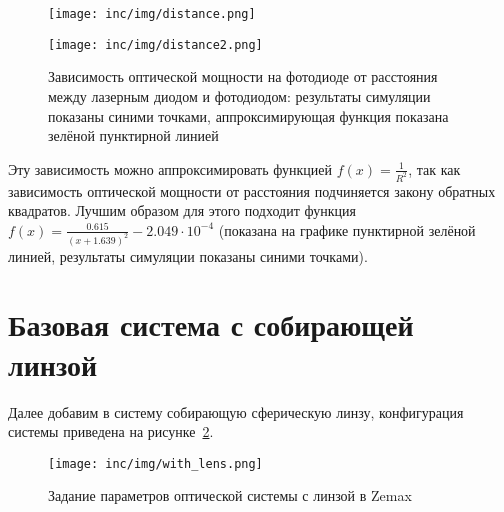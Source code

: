\begin{figure}[h]
    \centering
    \begin{minipage}[c]{.49\textwidth}
        \centering
        \texttt{[image: inc/img/distance.png]}
    \end{minipage}
    \hfill
    \begin{minipage}[c]{.49\textwidth}
        \centering
        \texttt{[image: inc/img/distance2.png]}
    \end{minipage}
    \caption{Зависимость оптической мощности на фотодиоде от расстояния между лазерным диодом и фотодиодом: результаты симуляции показаны синими точками, аппроксимирующая функция показана зелёной пунктирной линией}
    \label{fig:distance_plot}
\end{figure}

Эту зависимость можно аппроксимировать функцией $f(x) = \frac{1}{R^2}$, так как зависимость оптической мощности от расстояния подчиняется закону обратных квадратов. Лучшим образом для этого подходит функция $f(x) = \frac{0.615}{(x+1.639)^2} - 2.049\cdot10^{-4}$ (показана на графике пунктирной зелёной линией, результаты симуляции показаны синими точками).


%     

\section{Базовая система с собирающей линзой}

Далее добавим в систему собирающую сферическую линзу, конфигурация системы приведена на рисунке~\ref{fig:with_lens_zemax}. 

\begin{figure}[!h]
    \centering
    \texttt{[image: inc/img/with\_lens.png]}
    \caption{Задание параметров оптической системы с линзой в Zemax}
    \label{fig:with_lens_zemax}
\end{figure}

